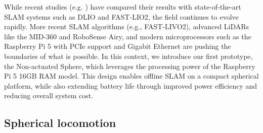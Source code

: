 \documentclass[conference]{IEEEtran}
\begin{document}
While recent studies (e.g. \cite{Kalman_filter_sphere}) have compared their results with state-of-the-art SLAM systems such as DLIO\cite{dlio} and FAST-LIO2\cite{fastlio2}, the field continues to evolve rapidly. 
More recent SLAM algorithms (e.g., FAST-LIVO2\cite{fastlivo2}), advanced LiDARs like the MID-360 and RoboSense Airy, and modern microprocessors such as the Raspberry Pi 5 with PCIe support and Gigabit Ethernet are pushing the boundaries of what is possible. 
In this context, we introduce our first prototype, the Non-actuated Sphere, which leverages the processing power of the Raspberry Pi 5 16GB RAM model. 
This design enables offline SLAM on a compact spherical platform, while also extending battery life through improved power efficiency and reducing overall system cost.
\subsection{Spherical locomotion}

\label{sec:state-of-the-art}
\end{document}
